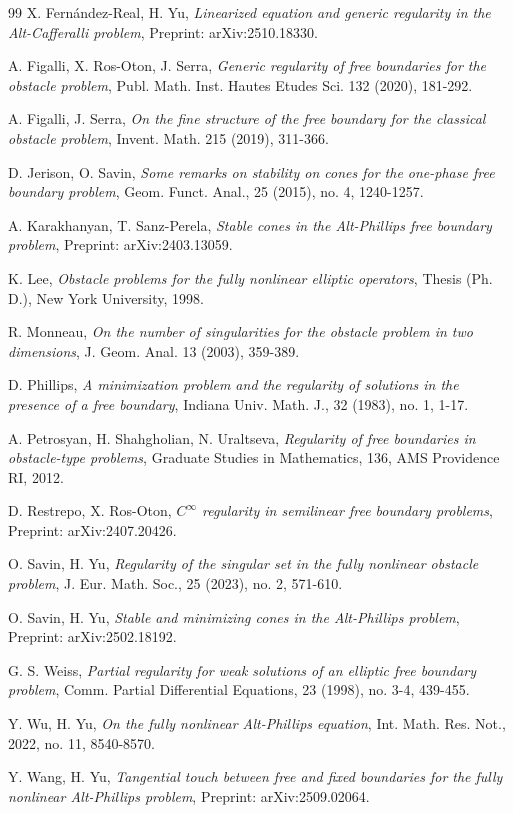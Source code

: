 \documentclass{amsart}
\theoremstyle{definition}
\numberwithin{equation}{section}
\theoremstyle{remark}
\begin{document}
\begin{thebibliography}{99}
 X. Fern\'andez-Real, H. Yu, \emph{Linearized equation and generic regularity in the Alt-Cafferalli problem}, {Preprint: arXiv:2510.18330}.

 A. Figalli, X. Ros-Oton, J. Serra, \emph{Generic regularity of free boundaries for the obstacle problem}, Publ. Math. Inst. Hautes Etudes Sci. 132 (2020), 181-292.

 A. Figalli, J. Serra, {\em On the fine structure of the free boundary for the classical obstacle problem}, Invent. Math. 215 (2019), 311-366.

 D. Jerison, O. Savin, \emph{Some remarks on stability on cones for the one-phase free boundary problem}, {Geom. Funct. Anal.}, 25 (2015), no. 4, 1240-1257.



 A. Karakhanyan, T. Sanz-Perela, \emph{Stable cones in the Alt-Phillips free boundary problem}, {Preprint: arXiv:2403.13059}.


 K. Lee, {\em Obstacle problems for the fully nonlinear elliptic operators}, Thesis (Ph. D.), New York University, 1998. 

 R. Monneau, {\em On the number of singularities for the obstacle problem  in two dimensions}, J. Geom. Anal. 13 (2003), 359-389.

 D. Phillips, \emph{A minimization problem and the regularity of solutions in the presence of a free boundary}, {Indiana Univ. Math. J.}, 32 (1983), no. 1, 1-17.

 A. Petrosyan, H. Shahgholian, N. Uraltseva, {\em Regularity of free boundaries in obstacle-type problems}, Graduate Studies in Mathematics, 136, AMS Providence RI, 2012.

 D. Restrepo, X. Ros-Oton, \emph{$C^\infty$ regularity in semilinear free boundary problems}, {Preprint: arXiv:2407.20426}.

 O. Savin, H. Yu, \emph{Regularity of the singular set in the fully nonlinear obstacle problem}, {J. Eur. Math. Soc.}, 25 (2023), no. 2, 571-610.

 O. Savin, H. Yu, \emph{Stable and minimizing cones in the Alt-Phillips problem}, {Preprint: arXiv:2502.18192.}     

 G. S. Weiss, \emph{Partial regularity for weak solutions of an elliptic free boundary problem}, {Comm. Partial Differential Equations}, 23 (1998), no. 3-4, 439-455.

 Y. Wu, H. Yu, \emph{On the fully nonlinear Alt-Phillips equation}, {Int. Math. Res. Not.}, 2022, no. 11, 8540-8570.

Y. Wang, H. Yu, \emph{Tangential touch between free and fixed boundaries for the fully nonlinear Alt-Phillips problem}, {Preprint: arXiv:2509.02064}.




\end{thebibliography}
\end{document}
